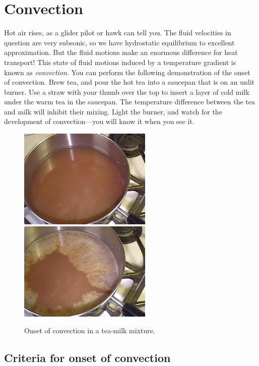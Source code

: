 \chapter{Convection}\label{s.convection}

Hot air rises, as a glider pilot or hawk can tell you. The fluid velocities in question are very subsonic, so we have hydrostatic equilibrium to excellent approximation. But the fluid motions make an enormous difference for heat transport! This state of fluid motions induced by a temperature gradient is known as \emph{convection}. You can perform the following demonstration of the onset of convection.  Brew tea, and pour the hot tea into a saucepan that is on an unlit burner.  Use a straw with your thumb over the top to insert a layer of cold milk under the warm tea in the saucepan.  The temperature difference between the tea and milk will inhibit their mixing. Light the burner, and watch for the development of convection---you will know it when you see it.

\begin{figure}[htbp]
\includegraphics[width=180pt]{convection-1}\includegraphics[width=180pt]{convection-2}
\caption{Onset of convection in a tea-milk mixture.\label{f.tea}}
\end{figure}

\section{Criteria for onset of convection}\label{s.convection-onset}

